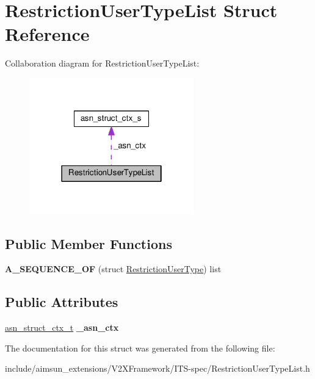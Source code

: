 \hypertarget{structRestrictionUserTypeList}{}\section{Restriction\+User\+Type\+List Struct Reference}
\label{structRestrictionUserTypeList}


Collaboration diagram for Restriction\+User\+Type\+List\+:\nopagebreak
\begin{figure}[H]
\begin{center}
\leavevmode
\includegraphics[width=202pt]{structRestrictionUserTypeList__coll__graph}
\end{center}
\end{figure}
\subsection*{Public Member Functions}
\begin{DoxyCompactItemize}
\item 
{\bfseries A\+\_\+\+S\+E\+Q\+U\+E\+N\+C\+E\+\_\+\+OF} (struct \hyperlink{structRestrictionUserType}{Restriction\+User\+Type}) list\hypertarget{structRestrictionUserTypeList_a386c65d6a4a6981a1fe6fead3904e18a}{}\label{structRestrictionUserTypeList_a386c65d6a4a6981a1fe6fead3904e18a}

\end{DoxyCompactItemize}
\subsection*{Public Attributes}
\begin{DoxyCompactItemize}
\item 
\hyperlink{structasn__struct__ctx__s}{asn\+\_\+struct\+\_\+ctx\+\_\+t} {\bfseries \+\_\+asn\+\_\+ctx}\hypertarget{structRestrictionUserTypeList_a0306fe2f642f3716eb4c7a92bddf68cd}{}\label{structRestrictionUserTypeList_a0306fe2f642f3716eb4c7a92bddf68cd}

\end{DoxyCompactItemize}


The documentation for this struct was generated from the following file\+:\begin{DoxyCompactItemize}
\item 
include/aimsun\+\_\+extensions/\+V2\+X\+Framework/\+I\+T\+S-\/spec/Restriction\+User\+Type\+List.\+h\end{DoxyCompactItemize}
